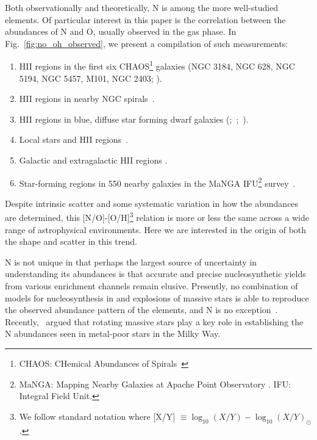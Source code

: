\documentclass[ms.tex]{subfiles}
\begin{document}
Both observationally and theoretically, N is among the more well-studied
elements.
Of particular interest in this paper is the correlation between the abundances
of N and O, usually observed in the gas phase.
In Fig.~\ref{fig:no_oh_observed}, we present a compilation of such measurements:
\begin{enumerate}
	\item[\textbf{1.}] HII regions in the first six CHAOS\footnote{
		CHAOS: CHemical Abundances of Spirals~\citep{Berg2015}
	} galaxies (NGC 3184, NGC 628, NGC 5194, NGC 5457, M101, NGC 2403;
	\citealp{Berg2020, Skillman2020, Rogers2021}).

	\item[\textbf{2.}] HII regions in nearby NGC spirals~\citep*{Pilyugin2010}.

	\item[\textbf{3.}] HII regions in blue, diffuse star forming dwarf galaxies
	(\citealp{Berg2012};~\citealp*{Izotov2012};~\citealp{James2015}).

	\item[\textbf{4.}] Local stars and HII regions~\citep{Dopita2016}.

	\item[\textbf{5.}] Galactic and extragalactic HII regions
	\citep*{Henry2000}.

	\item[\textbf{6.}] Star-forming regions in 550  nearby galaxies in the
	MaNGA IFU\footnote{
		MaNGA: Mapping Nearby Galaxies at Apache Point Observatory
		\citep{Bundy2015}.
		IFU: Integral Field Unit.
	} survey~\citep{Belfiore2017}.
\end{enumerate}
Despite intrinsic scatter and some systematic variation in how the abundances
are determined, this [N/O]-[O/H]\footnote{
	We follow standard notation where [X/Y]
	$\equiv \log_{10}(X/Y) - \log_{10}(X/Y)_\odot$.
} relation is more or less the same across a wide range of astrophysical
environments.
Here we are interested in the origin of both the shape and scatter in this
trend.
\par
N is not unique in that perhaps the largest source of uncertainty in
understanding its abundances is that accurate and precise nucleosynthetic yields
from various enrichment channels remain elusive.
Presently, no combination of models for nucleosynthesis in and explosions of
massive stars is able to reproduce the observed abundance pattern of the
elements, and N is no exception~\citep{Griffith2021}.
Recently,~\citet*{Grisoni2021} argued that rotating massive stars play a key
role in establishing the N abundances seen in metal-poor stars in the Milky Way.
\end{document}
